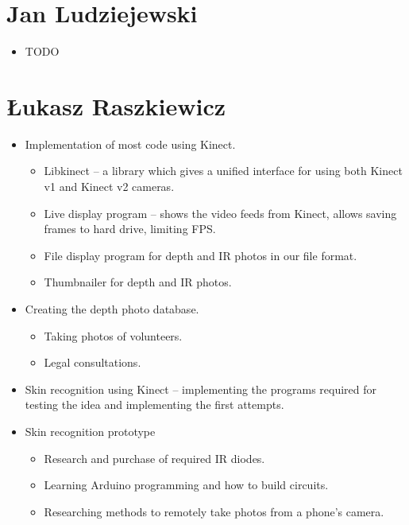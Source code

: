     \section{Jan Ludziejewski}
        \begin{itemize}
            \item TODO
        \end{itemize}

    \section{Łukasz Raszkiewicz}
        \begin{itemize}
            \item Implementation of most code using Kinect.
            \begin{itemize}
                \item Libkinect -- a library which gives a unified interface for
                using both Kinect v1 and Kinect v2 cameras.
                \item Live display program -- shows the video feeds from Kinect,
                allows saving frames to hard drive, limiting FPS.
                \item File display program for depth and IR photos in our file format.
                \item Thumbnailer for depth and IR photos.
            \end{itemize}
            \item Creating the depth photo database.
            \begin{itemize}
                \item Taking photos of volunteers.
                \item Legal consultations.
            \end{itemize}
            \item Skin recognition using Kinect -- implementing the programs required
            for testing the idea and implementing the first attempts.
            \item Skin recognition prototype
            \begin{itemize}
                \item Research and purchase of required IR diodes.
                \item Learning Arduino programming and how to build circuits.
                \item Researching methods to remotely take photos from a phone's camera.

\end{itemize}
\end{itemize}
